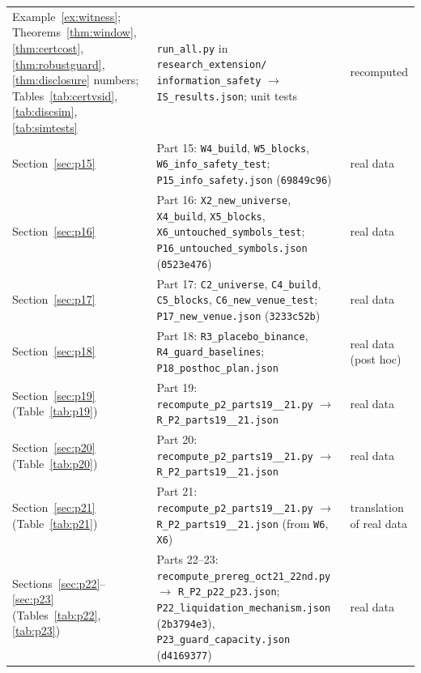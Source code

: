 \begin{longtable}{p{}p{}p{}}
Example~\ref{ex:witness}; Theorems~\ref{thm:window}, \ref{thm:certcost}, \ref{thm:robustguard}, \ref{thm:disclosure} numbers; Tables~\ref{tab:certvsid}, \ref{tab:discsim}, \ref{tab:simtests} & \texttt{run\_all.py} in \texttt{research\_extension/} \texttt{information\_safety} $\to$ \texttt{IS\_results.json}; unit tests & recomputed\\
Section~\ref{sec:p15} & Part 15: \texttt{W4\_build}, \texttt{W5\_blocks}, \texttt{W6\_info\_safety\_test}; \texttt{P15\_info\_safety.json} (\texttt{69849c96}) & real data\\
Section~\ref{sec:p16} & Part 16: \texttt{X2\_new\_universe}, \texttt{X4\_build}, \texttt{X5\_blocks}, \texttt{X6\_untouched\_symbols\_test}; \texttt{P16\_untouched\_symbols.json} (\texttt{0523e476}) & real data\\
Section~\ref{sec:p17} & Part 17: \texttt{C2\_universe}, \texttt{C4\_build}, \texttt{C5\_blocks}, \texttt{C6\_new\_venue\_test}; \texttt{P17\_new\_venue.json} (\texttt{3233c52b}) & real data\\
Section~\ref{sec:p18} & Part 18: \texttt{R3\_placebo\_binance}, \texttt{R4\_guard\_baselines}; \texttt{P18\_posthoc\_plan.json} & real data (post hoc)\\
Section~\ref{sec:p19} (Table~\ref{tab:p19}) & Part 19: \texttt{recompute\_\allowbreak p2\_\allowbreak parts19\_\allowbreak 20\_\allowbreak 21.py} $\to$ \texttt{R\_P2\_\allowbreak parts19\_\allowbreak 20\_\allowbreak 21.json} & real data\\
Section~\ref{sec:p20} (Table~\ref{tab:p20}) & Part 20: \texttt{recompute\_\allowbreak p2\_\allowbreak parts19\_\allowbreak 20\_\allowbreak 21.py} $\to$ \texttt{R\_P2\_\allowbreak parts19\_\allowbreak 20\_\allowbreak 21.json} & real data\\
Section~\ref{sec:p21} (Table~\ref{tab:p21}) & Part 21: \texttt{recompute\_\allowbreak p2\_\allowbreak parts19\_\allowbreak 20\_\allowbreak 21.py} $\to$ \texttt{R\_P2\_\allowbreak parts19\_\allowbreak 20\_\allowbreak 21.json} (from \texttt{W6}, \texttt{X6}) & translation of real data\\
Sections~\ref{sec:p22}--\ref{sec:p23} (Tables~\ref{tab:p22}, \ref{tab:p23}) & Parts 22--23: \texttt{recompute\_\allowbreak prereg\_\allowbreak oct21\_\allowbreak 22nd.py} $\to$ \texttt{R\_P2\_\allowbreak p22\_\allowbreak p23.json}; \texttt{P22\_\allowbreak liquidation\_\allowbreak mechanism.json} (\texttt{2b3794e3}), \texttt{P23\_\allowbreak guard\_\allowbreak capacity.json} (\texttt{d4169377}) & real data\\

\end{longtable}
